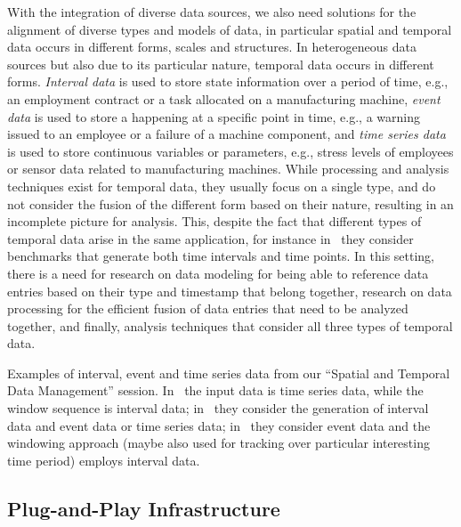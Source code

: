 \documentclass[11pt,dvipdfm]{article}
\begin{document}
With the integration of diverse data sources, we also need solutions for the alignment of diverse types and models of data, in particular spatial and temporal data occurs in different forms, scales and structures. 
In heterogeneous data sources but also due to its particular nature, temporal data occurs in different forms. \emph{Interval data} is used to store state information over a period of time, e.g., an employment contract or a task allocated on a manufacturing machine, \emph{event data} is used to store a happening at a specific point in time, e.g., a warning issued to an employee or a failure of a machine component, and \emph{time series data} is used to store continuous variables or parameters, e.g., stress levels of employees or sensor data related to manufacturing machines. While processing and analysis techniques exist for temporal data, they usually focus on a single type, and do not consider the fusion of the different form based on their nature, resulting in an incomplete picture for analysis. This, despite the fact that different types of temporal data arise in the same application, for instance in~\cite{conf/icde/BNS2022} they consider benchmarks that generate both time intervals and time points. In this setting, there is a need for research on data modeling for being able to reference data entries based on their type and timestamp that belong together, research on data processing for the efficient fusion of data entries that need to be analyzed together, and finally, analysis techniques that consider all three types of temporal data.

Examples of interval, event and time series data from our ``Spatial and Temporal Data Management'' session. In~\cite{conf/icde/ZWTLWWW2022} the input data is time series data, while the window sequence is interval data; in~\cite{conf/icde/BNS2022} they consider the generation of interval data and event data or time series data; in~\cite{conf/icde/KM2022} they consider event data and the windowing approach (maybe also used for tracking over particular interesting time period) employs interval data.

\subsection{Plug-and-Play Infrastructure}
\end{document}
